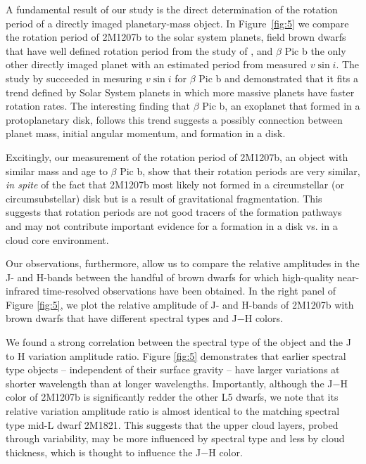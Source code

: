\documentclass[apj]{emulateapj}
\newcommand{\bpic}{$\beta$ Pic}
\newcommand{\vsini}{$v\sin i$}
\begin{document}
A fundamental result of our study is the direct determination of the
rotation period of a directly imaged planetary-mass object. In
Figure~\ref{fig:5} we compare the rotation period of 2M1207b to the
solar system planets, field brown dwarfs that have well defined
rotation period from the study of
\citep[][]{Metchev2015}, and \bpic{} b the only other directly imaged
planet with an estimated period from measured \vsini{}.  The study by
\citep[][]{Snellen2014} succeeded in mesuring \vsini{} for \bpic{} b
and demonstrated that it fits a trend defined by Solar System planets
in which more massive planets have faster rotation rates. The
interesting finding that \bpic{} b, an exoplanet that formed in a
protoplanetary disk, follows this trend suggests a possibly connection
between planet mass, initial angular momentum, and formation in a
disk.

Excitingly, our measurement of the rotation period of 2M1207b, an
object with similar mass and age to \bpic{} b, show that their rotation
periods are very similar, {\em in spite } of the fact that 2M1207b 
most likely not formed in a circumstellar (or circumsubstellar) disk
but is a result of gravitational fragmentation. This suggests
that rotation periods are not good tracers of the formation pathways
and may not contribute important evidence for a formation in a disk
vs. in a cloud core environment.

Our observations, furthermore, allow us to compare the relative
amplitudes in the J- and H-bands between the handful of brown dwarfs
for which high-quality near-infrared time-resolved observations have
been obtained. In the right panel of Figure \ref{fig:5}, we plot the
relative amplitude of J- and H-bands of 2M1207b with brown dwarfs
\citep{Apai2013,Buenzli2012,Buenzli2015,Burgasser2013,Radigan2012,Yang2014} that
have different spectral types and J$-$H colors.

We found a strong correlation between the spectral type of the object
and the J to H variation amplitude ratio. Figure \ref{fig:5}
demonstrates that earlier spectral type objects -- independent of
their surface gravity -- have larger variations at shorter wavelength
than at longer wavelengths. Importantly, although the J$-$H color of
2M1207b is significantly redder the other L5 dwarfs, we note that its
relative variation amplitude ratio is almost identical to the matching
spectral type mid-L dwarf 2M1821. This suggests that the upper cloud
layers, probed through variability, may be more influenced by spectral
type and less by cloud thickness, which is thought to influence the
J$-$H color.
\end{document}
